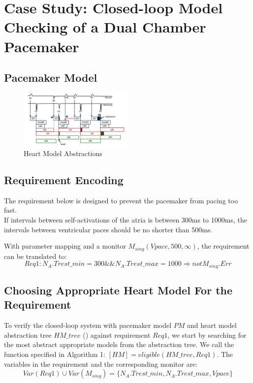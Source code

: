 \section{Case Study: Closed-loop Model Checking of a Dual Chamber Pacemaker}
\subsection{Pacemaker Model}
\begin{figure}[!t]
		\centering
		\includegraphics[width=0.5\textwidth]{figs/PM_timers.pdf}
		\caption{\small Heart Model Abstractions}
		\label{fig:PM_timers}
\end{figure}

\subsection{Requirement Encoding}
The requirement below is designed to prevent the pacemaker from pacing too fast.\\
\textsf{If intervals between self-activations of the atria is between 300ms to 1000ms, the intervals between ventricular paces should be no shorter than 500ms.}

With parameter mapping and a monitor $M_{sing}(Vpace,500,\infty)$, the requirement can be translated to:
$$Req1: N_A.Trest\_min=300 \&\& N_A.Trest\_max=1000 \Rightarrow not M_{sing}.Err$$
 \subsection{Choosing Appropriate Heart Model For the Requirement}
To verify the closed-loop system with pacemaker model $PM$ and heart model abstraction tree $HM\_tree$ () against requirement $Req1$, we start by searching for the most abstract appropriate models from the abstraction tree. We call the function specified in Algorithm 1: $[HM]=eligible(HM\_tree,Req1)$. The variables in the requirement and the corresponding monitor are:
$$Var(Req1)\cup Var(M_{sing})=\{N_A.Trest\_min,N_A.Trest\_max, Vpace\}$$

